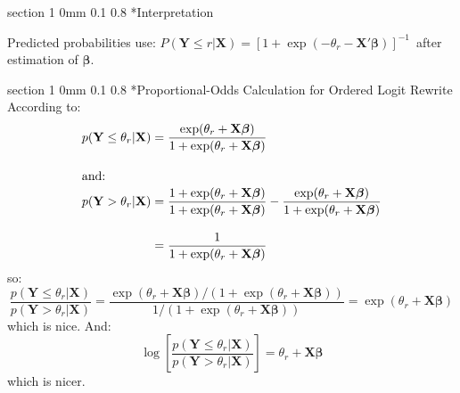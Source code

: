 \documentclass[12pt]{article}
\makeatletter
\newcommand{\B}{\boldsymbol{\beta}}
\newcommand{\Y}{\mathbf{Y}}
\newcommand{\9}{\\[9pt]}
\newcommand{\X}{\mathbf{X}}
\newcommand{\bgm}{\color{MyMath}}
\newcommand{\egm}{\color{white}}
\renewcommand{\section}{\@startsection
	    {section}%
	    {1}%
	    {0mm}%
	    {0.1\baselineskip}%
	    {0.8\baselineskip}%
	    {\newpage \color[cmyk]{0.43,0,0.01,0} \center\LARGE}}%
\makeatother
\begin{document}
\begin{landscape}
\begin{Large}
{\section*{Interpretation}
\begin{ohlist}
	\item	Predicted probabilities use: \bgm$ P(\Y\le r|\X) = [1+\exp(-\theta_r-\X'\B)]^{-1} $\egm\ after estimation of
            \bgm$\B$\egm.
\end{ohlist}
\begin{center}
\end{center}
\begin{comment}
postscript("Article.PTBI/ordered.logit.fig.ps")
theta <- c(-2,-0.5,3,4,7)
ruler <- seq(-8,8,length=300)
par(col.axis="white",col.lab="white",col.sub="white", col="white", bg="slategray",cex.lab=1.5,mar=c(6,6,2,2))
plot(ruler,exp(ruler)/(1+exp(ruler)),type="l",lwd=3, col="yellow",xlab="Predictor",ylab="Probability",ylim=c(-0.1,1))
for (i in 1:length(theta))  {
    segments(theta[i],0,theta[i],exp(theta[i])/(1+exp(theta[i])), col="black",lwd=1.5)
    text(expression(theta),x=theta[i],y=-0.07,col="black",cex=1.5)
    text(i,x=(theta[i]+0.2),y=-0.08,col="black",cex=1.0)
}
abline(h=0,col="white")
lines(ruler,exp(ruler)/(1+exp(ruler)),lwd=3, col="yellow")
dev.off()
\end{comment}

\section*{Proportional-Odds Calculation for Ordered Logit}
\noindent Rewrite According to:
\bgm\begin{align*}
	p(\Y \le \theta_r|\X) 	&= \frac{ \exp(\theta_r+\X\B) }{ 1 + \exp(\theta_r+\X\B) }	\9
	\intertext{\textcolor{black}{and:}}
	p(\Y > \theta_r|\X)	&= \frac{ 1+ \exp(\theta_r+\X\B) }{ 1 + \exp(\theta_r+\X\B) } 
	                         - \frac{ \exp(\theta_r+\X\B) }{ 1 + \exp(\theta_r+\X\B) }	\9
	                        &= \frac{ 1 }{ 1 + \exp(\theta_r+\X\B) }	
\end{align*}\egm
so:
\bgm\begin{equation*}
	\frac{ p(\Y \le \theta_r|\X) }{ p(\Y > \theta_r|\X) } 
		= \frac{ \exp(\theta_r+\X\B) / (1 + \exp(\theta_r+\X\B)) }
			{ 1 / (1 + \exp(\theta_r+\X\B)) }
		= \exp(\theta_r+\X\B)
\end{equation*}\egm
which is nice.  And:
\bgm\begin{equation*}
	\log\left[ \frac{ p(\Y \le \theta_r|\X) }{ p(\Y > \theta_r|\X) } \right] = \theta_r+\X\B
\end{equation*}\egm
which is nicer.

}
\end{Large}
\end{landscape}
\end{document}
